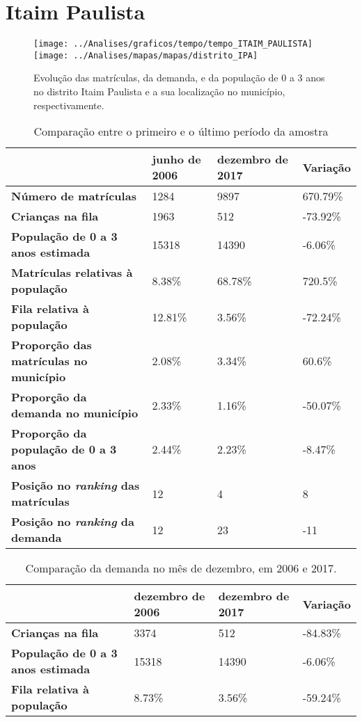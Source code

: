 \section{Itaim Paulista}
\begin{figure}[H]
	\centering
	\texttt{[image: ../Analises/graficos/tempo/tempo\_ITAIM\_PAULISTA]}
	\texttt{[image: ../Analises/mapas/mapas/distrito\_IPA]}
	\caption{Evolução das matrículas, da demanda, e da população de 0 a 3 anos no distrito Itaim Paulista e a sua localização no município, respectivamente.}
\end{figure}
\begin{table}[H]
	\begin{tabular}{|l|l|l|l|}
		\hline
		\textbf{}                                      & \textbf{junho de 2006}       & \textbf{dezembro de 2017}    & \textbf{Variação} \\ \hline
		\textbf{Número de matrículas}                  & 1284 & 9897 & 670.79\% \\ \hline
		\textbf{Crianças na fila}                      & 1963 & 512 & -73.92\% \\ \hline
		\textbf{População de 0 a 3 anos estimada}      & 15318 & 14390 & -6.06\% \\ \hline
		\textbf{Matrículas relativas à população}      & 8.38\% & 68.78\% & 720.5\% \\ \hline
		\textbf{Fila relativa à população}             & 12.81\% & 3.56\% & -72.24\% \\ \hline
		\textbf{Proporção das matrículas no município} & 2.08\% & 3.34\% & 60.6\% \\ \hline
		\textbf{Proporção da demanda no município}     & 2.33\% & 1.16\% & -50.07\% \\ \hline
		\textbf{Proporção da população de 0 a 3 anos}  & 2.44\% & 2.23\% & -8.47\% \\ \hline
		\textbf{Posição no \textit{ranking} das matrículas}     & 12 & 4 & 8 \\ \hline
		\textbf{Posição no \textit{ranking} da demanda}         & 12 & 23 & -11 \\ \hline
	\end{tabular}
	\caption{Comparação entre o primeiro e o último período da amostra}
\end{table}
\begin{table}[H]
	\begin{tabular}{|l|l|l|l|}
		\hline
		\textbf{}                                 & \textbf{dezembro de 2006} & \textbf{dezembro de 2017} & \textbf{Variação} \\ \hline
		\textbf{Crianças na fila}                      & 3374 & 512 & -84.83\% \\ \hline
		\textbf{População de 0 a 3 anos estimada}      & 15318 & 14390 & -6.06\% \\ \hline
		\textbf{Fila relativa à população}             & 8.73\% & 3.56\% & -59.24\% \\ \hline
	\end{tabular}
	\caption{Comparação da demanda no mês de dezembro, em 2006 e 2017.}
\end{table}
